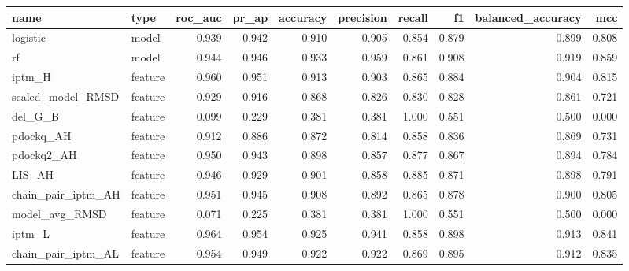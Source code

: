 \begin{tabular}{llrrrrrrrr}
\toprule
name & type & roc_auc & pr_ap & accuracy & precision & recall & f1 & balanced_accuracy & mcc \\
\midrule
logistic & model & 0.939 & 0.942 & 0.910 & 0.905 & 0.854 & 0.879 & 0.899 & 0.808 \\
rf & model & 0.944 & 0.946 & 0.933 & 0.959 & 0.861 & 0.908 & 0.919 & 0.859 \\
iptm_H & feature & 0.960 & 0.951 & 0.913 & 0.903 & 0.865 & 0.884 & 0.904 & 0.815 \\
scaled_model_RMSD & feature & 0.929 & 0.916 & 0.868 & 0.826 & 0.830 & 0.828 & 0.861 & 0.721 \\
del_G_B & feature & 0.099 & 0.229 & 0.381 & 0.381 & 1.000 & 0.551 & 0.500 & 0.000 \\
pdockq_AH & feature & 0.912 & 0.886 & 0.872 & 0.814 & 0.858 & 0.836 & 0.869 & 0.731 \\
pdockq2_AH & feature & 0.950 & 0.943 & 0.898 & 0.857 & 0.877 & 0.867 & 0.894 & 0.784 \\
LIS_AH & feature & 0.946 & 0.929 & 0.901 & 0.858 & 0.885 & 0.871 & 0.898 & 0.791 \\
chain_pair_iptm_AH & feature & 0.951 & 0.945 & 0.908 & 0.892 & 0.865 & 0.878 & 0.900 & 0.805 \\
model_avg_RMSD & feature & 0.071 & 0.225 & 0.381 & 0.381 & 1.000 & 0.551 & 0.500 & 0.000 \\
iptm_L & feature & 0.964 & 0.954 & 0.925 & 0.941 & 0.858 & 0.898 & 0.913 & 0.841 \\
chain_pair_iptm_AL & feature & 0.954 & 0.949 & 0.922 & 0.922 & 0.869 & 0.895 & 0.912 & 0.835 \\
\bottomrule
\end{tabular}
